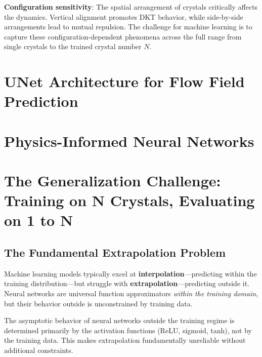 \textbf{Configuration sensitivity}: The spatial arrangement of crystals critically affects the dynamics. Vertical alignment promotes DKT behavior, while side-by-side arrangements lead to mutual repulsion. The challenge for machine learning is to capture these configuration-dependent phenomena across the full range from single crystals to the trained crystal number $N$.

\section{UNet Architecture for Flow Field Prediction}
\label{sec:unet}


\section{Physics-Informed Neural Networks}
\label{sec:pinns}


\section{The Generalization Challenge: Training on N Crystals, Evaluating on 1 to N}
\label{sec:generalization}

\subsection{The Fundamental Extrapolation Problem}

Machine learning models typically excel at \textbf{interpolation}---predicting within the training distribution---but struggle with \textbf{extrapolation}---predicting outside it. Neural networks are universal function approximators \textit{within the training domain}, but their behavior outside is unconstrained by training data.

The asymptotic behavior of neural networks outside the training regime is determined primarily by the activation functions (ReLU, sigmoid, tanh), not by the training data. This makes extrapolation fundamentally unreliable without additional constraints.

